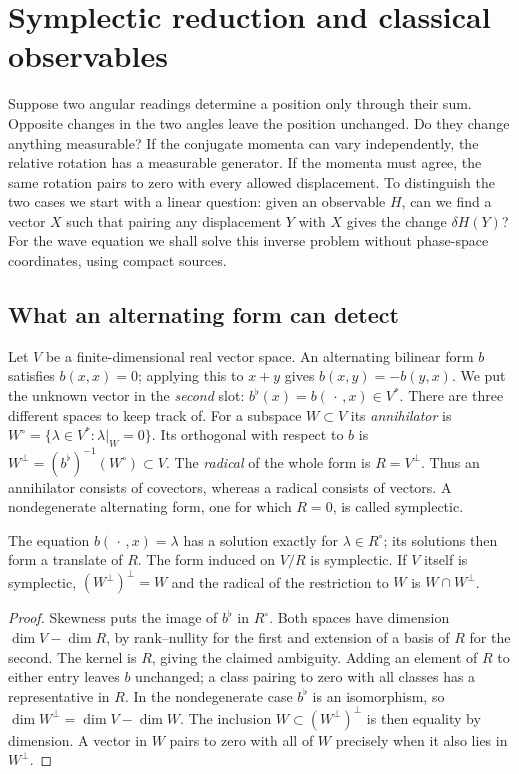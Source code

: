 \chapter{Symplectic reduction and classical observables}\label{f:symplectic}
Suppose two angular readings determine a position only through their sum. Opposite changes in the two angles leave the position unchanged. Do they change anything measurable? If the conjugate momenta can vary independently, the relative rotation has a measurable generator. If the momenta must agree, the same rotation pairs to zero with every allowed displacement. To distinguish the two cases we start with a linear question: given an observable $H$, can we find a vector $X$ such that pairing any displacement $Y$ with $X$ gives the change $\delta H(Y)$? For the wave equation we shall solve this inverse problem without phase-space coordinates, using compact sources.

\section{What an alternating form can detect}
Let $V$ be a finite-dimensional real vector space. An alternating bilinear form $b$ satisfies $b(x,x)=0$; applying this to $x+y$ gives $b(x,y)=-b(y,x)$. We put the unknown vector in the \emph{second} slot: $b^\flat(x)=b(\,\cdot\,,x)\in V^*$. There are three different spaces to keep track of. For a subspace $W\subset V$ its \emph{annihilator} is $W^\circ=\{\lambda\in V^*: \lambda|_W=0\}$. Its orthogonal with respect to $b$ is $W^\perp=(b^\flat)^{-1}(W^\circ)\subset V$. The \emph{radical} of the whole form is $R=V^\perp$. Thus an annihilator consists of covectors, whereas a radical consists of vectors. A nondegenerate alternating form, one for which $R=0$, is called symplectic.

\begin{lemma}\label{f:alternating-quotient}
The equation $b(\,\cdot\,,x)=\lambda$ has a solution exactly for $\lambda\in R^\circ$; its solutions then form a translate of $R$. The form induced on $V/R$ is symplectic. If $V$ itself is symplectic, $(W^\perp)^\perp=W$ and the radical of the restriction to $W$ is $W\cap W^\perp$.
\end{lemma}
\begin{proof}
Skewness puts the image of $b^\flat$ in $R^\circ$. Both spaces have dimension $\dim V-\dim R$, by rank--nullity for the first and extension of a basis of $R$ for the second. The kernel is $R$, giving the claimed ambiguity. Adding an element of $R$ to either entry leaves $b$ unchanged; a class pairing to zero with all classes has a representative in $R$. In the nondegenerate case $b^\flat$ is an isomorphism, so $\dim W^\perp=\dim V-\dim W$. The inclusion $W\subset (W^\perp)^\perp$ is then equality by dimension. A vector in $W$ pairs to zero with all of $W$ precisely when it also lies in $W^\perp$.
\end{proof}

